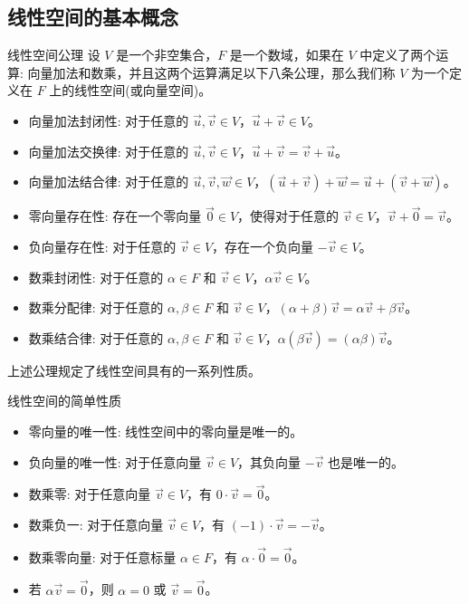 \documentclass[a4paper,12pt]{ctexart}
\begin{document}
\subsection{线性空间的基本概念}

    \begin{mydef}{线性空间公理}{}
    设 $V$ 是一个非空集合，$F$ 是一个数域，如果在 $V$ 中定义了两个运算: 向量加法和数乘，并且这两个运算满足以下八条公理，那么我们称 $V$ 为一个定义在 $F$ 上的线性空间(或向量空间)。
    \begin{itemize}
        \item 向量加法封闭性: 对于任意的 $\vec{u}, \vec{v} \in V$，$\vec{u} + \vec{v} \in V$。
        \item 向量加法交换律: 对于任意的 $\vec{u}, \vec{v} \in V$，$\vec{u} + \vec{v} = \vec{v} + \vec{u}$。
        \item 向量加法结合律: 对于任意的 $\vec{u}, \vec{v}, \vec{w} \in V$，$(\vec{u} + \vec{v}) + \vec{w} = \vec{u} + (\vec{v} + \vec{w})$。
        \item 零向量存在性: 存在一个零向量 $\vec{0} \in V$，使得对于任意的 $\vec{v} \in V$，$\vec{v} + \vec{0} = \vec{v}$。
        \item 负向量存在性: 对于任意的 $\vec{v} \in V$，存在一个负向量 $-\vec{v} \in V$。
        \item 数乘封闭性: 对于任意的 $\alpha \in F$ 和 $\vec{v} \in V$，$\alpha \vec{v} \in V$。
        \item 数乘分配律: 对于任意的 $\alpha, \beta \in F$ 和 $\vec{v} \in V$，$(\alpha + \beta) \vec{v} = \alpha \vec{v} + \beta \vec{v}$。
        \item 数乘结合律: 对于任意的 $\alpha, \beta \in F$ 和 $\vec{v} \in V$，$\alpha (\beta \vec{v}) = (\alpha \beta) \vec{v}$。
    \end{itemize}
    \end{mydef}
    
    上述公理规定了线性空间具有的一系列性质。

    \begin{myprop}{线性空间的简单性质}{}
    \begin{itemize}
        \item 零向量的唯一性: 线性空间中的零向量是唯一的。
        \item 负向量的唯一性: 对于任意向量 $\vec{v} \in V$，其负向量 $-\vec{v}$ 也是唯一的。
        \item 数乘零: 对于任意向量 $\vec{v} \in V$，有 $0 \cdot \vec{v} = \vec{0}$。
        \item 数乘负一: 对于任意向量 $\vec{v} \in V$，有 $(-1) \cdot \vec{v} = -\vec{v}$。
        \item 数乘零向量: 对于任意标量 $\alpha \in F$，有 $\alpha \cdot \vec{0} = \vec{0}$。
        \item 若 $\alpha \vec{v} = \vec{0}$，则 $\alpha = 0$ 或 $\vec{v} = \vec{0}$。
    \end{itemize}
    \end{myprop}
    
\end{document}
